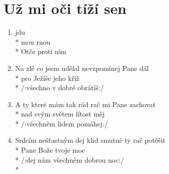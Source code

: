 \section{Už mi oči tíží sen}
\begin{enumerate}
\item {}      jdu   \\*
 mou rnou   \\*
Otče proti ním 
   
\item Na zlé co jsem udělal nevzpomínej Pane dál \\*
pro Ježíše jeho kříž \\*
/:všechno v dobré obrátíš:/ 
\item A ty které mám tak rád rač mi Pane zachovat \\*
nad svým světem lítost měj \\*
/:všechněm lidem pomáhej:/ 
\item Srdcím nešťastným dej klid smutné ty rač potěšit \\*
Pane Bože tvoje moc \\*
/:dej nám všechněm dobrou noc:/ \\*
\end{enumerate}

